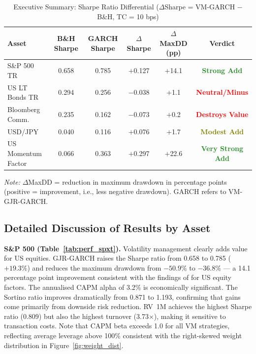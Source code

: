 \documentclass[12pt, a4paper]{article}
\begin{document}
\begin{table}[H]
  \centering
  \caption{Executive Summary: Sharpe Ratio Differential ($\Delta$Sharpe = VM-GARCH $-$ B\&H, TC = 10 bps)}
  \label{tab:summary}
  \small
  \begin{tabular}{lccccc}
    \toprule
    \textbf{Asset} & \textbf{B\&H Sharpe} & \textbf{GARCH Sharpe}
                   & \textbf{$\Delta$Sharpe} & \textbf{$\Delta$MaxDD (pp)} & \textbf{Verdict} \\
    \midrule
    S\&P 500 TR          & 0.658 & 0.785 & $+$0.127 & $+$14.1
      & \textcolor{ForestGreen}{\textbf{Strong Add}} \\
    US LT Bonds TR       & 0.294 & 0.256 & $-$0.038 & $+$1.1
      & \textcolor{Red}{\textbf{Neutral/Minus}} \\
    Bloomberg Comm.      & 0.235 & 0.162 & $-$0.073 & $+$0.2
      & \textcolor{Red}{\textbf{Destroys Value}} \\
    USD/JPY              & 0.040 & 0.116 & $+$0.076 & $+$1.7
      & \textcolor{olive}{\textbf{Modest Add}} \\
    US Momentum Factor   & 0.066 & 0.363 & $+$0.297 & $+$22.6
      & \textcolor{ForestGreen}{\textbf{Very Strong Add}} \\
    \bottomrule
  \end{tabular}
  \begin{minipage}{\textwidth}
    \vspace{2pt}
    \footnotesize\textit{Note:} $\Delta$MaxDD = reduction in maximum drawdown in percentage points
    (positive = improvement, i.e., less negative drawdown). GARCH refers to VM-GJR-GARCH.
  \end{minipage}
\end{table}

\subsection{Detailed Discussion of Results by Asset}

\textbf{S\&P 500 (Table~\ref{tab:perf_spxt}).} Volatility management clearly adds value
for US equities. GJR-GARCH raises the Sharpe ratio from 0.658 to 0.785 ($+19.3\%$) and
reduces the maximum drawdown from $-50.9\%$ to $-36.8\%$ --- a 14.1 percentage point
improvement consistent with the findings of \citet{Moreira2017} for US equity factors.
The annualised CAPM alpha of 3.2\% is economically significant. The Sortino ratio
improves dramatically from 0.871 to 1.193, confirming that gains come primarily from
downside risk reduction. RV~1M achieves the highest Sharpe ratio (0.809) but also the
highest turnover (3.73$\times$), making it sensitive to transaction costs. Note that
CAPM beta exceeds 1.0 for all VM strategies, reflecting average leverage above 100\%
consistent with the right-skewed weight distribution in Figure~\ref{fig:weight_dist}.
\end{document}
